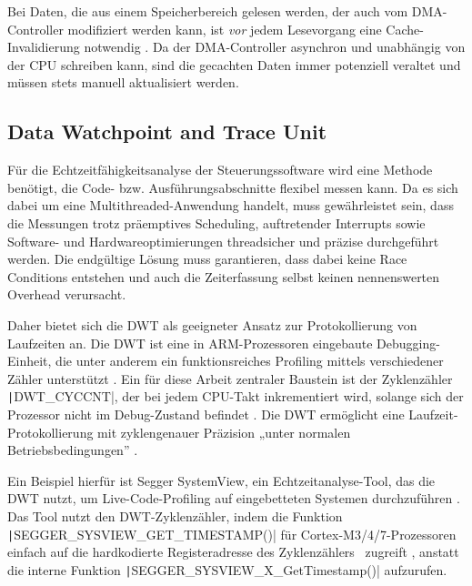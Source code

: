 Bei Daten, die aus einem Speicherbereich gelesen werden, der auch vom
DMA-Controller modifiziert werden kann, ist \textit{vor} jedem Lesevorgang eine
Cache-Invalidierung notwendig \cite{embeddedexpert_cache}. Da der DMA-Controller
asynchron und unabhängig von der CPU schreiben kann, sind die gecachten Daten
immer potenziell veraltet und müssen stets manuell aktualisiert werden.

\subsection{Data Watchpoint and Trace Unit} \label{sec:dwt}

Für die Echtzeitfähigkeitsanalyse der Steuerungssoftware wird eine Methode
benötigt, die Code- bzw. Ausführungsabschnitte flexibel messen kann. Da es sich
dabei um eine Multithreaded-Anwendung handelt, muss gewährleistet sein, dass die
Messungen trotz präemptives Scheduling, auftretender Interrupts sowie Software-
und Hardwareoptimierungen threadsicher und präzise durchgeführt werden. Die
endgültige Lösung muss garantieren, dass dabei keine Race Conditions entstehen
und auch die Zeiterfassung selbst keinen nennenswerten Overhead verursacht.

Daher bietet sich die DWT als geeigneter Ansatz zur Protokollierung von
Laufzeiten an. Die DWT ist eine in ARM-Prozessoren eingebaute Debugging-Einheit,
die unter anderem ein funktionsreiches Profiling mittels verschiedener Zähler
unterstützt \cite{ARMv7_ref_man_dwt_profiling}. Ein für diese Arbeit zentraler
Baustein ist der Zyklenzähler \texttt|DWT_CYCCNT|, der bei jedem CPU-Takt
inkrementiert wird, solange sich der Prozessor nicht im Debug-Zustand befindet
\cite{ARMv7_ref_man_dwt_cycle}. Die DWT ermöglicht eine Laufzeit-Protokollierung
mit zyklengenauer Präzision „unter normalen Betriebsbedingungen”
\cite{ARMv7_ref_man_dwt_profiling}.

Ein Beispiel hierfür ist Segger SystemView, ein Echtzeitanalyse-Tool, das die
DWT nutzt, um Live-Code-Profiling auf eingebetteten Systemen durchzuführen
\cite{SEGGER_SystemView}. Das Tool nutzt den DWT-Zyklenzähler, indem die
Funktion \texttt|SEGGER_SYSVIEW_GET_TIMESTAMP()| für
Cortex-M3/4/7-Prozessoren einfach auf die hardkodierte Registeradresse des
Zyklenzählers~\cite{Arm_DWT_Programmers_Model} zugreift \cite[S.
65]{Segger_SystemView_manual}, anstatt die interne Funktion
\linebreak \texttt|SEGGER_SYSVIEW_X_GetTimestamp()| aufzurufen.
